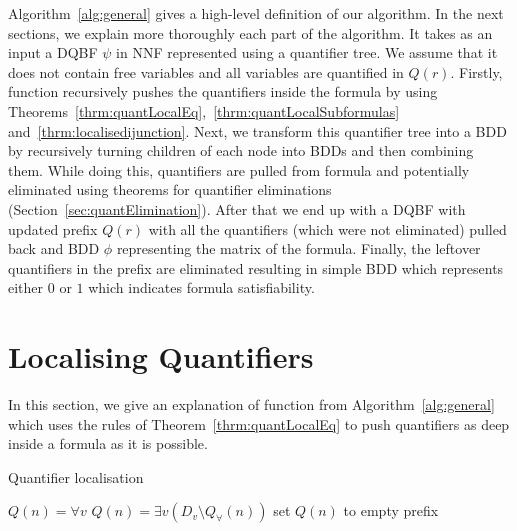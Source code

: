 \documentclass[
  digital, %
  color,
  twoside, %
  table,   %
  nolof,     %
  nolot,     %
]{fithesis3}
\theoremstyle{definition}
\theoremstyle{remark}
\newcommand{\qtlabel}[1]{l({#1})}
\newcommand{\prefix}[1]{Q({#1})}
\newcommand{\eprefix}[1]{Q_{\exists}(#1)}
\newcommand{\uprefix}[1]{Q_{\forall}(#1)}
\newcommand{\children}[1]{children({#1})}
\begin{document}
Algorithm~\ref{alg:general} gives a high-level definition of our algorithm. In the next sections, we explain more thoroughly each part of the algorithm. It takes as an input a DQBF $\psi$ in NNF represented using a quantifier tree. We assume that it does not contain free variables and all variables are quantified in $\prefix{r}$. Firstly, function  recursively pushes the quantifiers inside the formula by using Theorems~\ref{thrm:quantLocalEq},~\ref{thrm:quantLocalSubformulas} and~\ref{thrm:localisedijunction}. Next, we transform this quantifier tree into a BDD by recursively turning children of each node into BDDs and then combining them. While doing this, quantifiers are pulled from formula and potentially eliminated using theorems for quantifier eliminations (Section~\ref{sec:quantElimination}). After that we end up with a DQBF with updated prefix $\prefix{r}$ with all the quantifiers (which were not eliminated) pulled back and BDD $\phi$ representing the matrix of the formula. Finally, the leftover quantifiers in the prefix are eliminated resulting in simple BDD which represents either $0$ or $1$ which indicates formula satisfiability.

\section{Localising Quantifiers}
\label{sec:alglocalise}
In this section, we give an explanation of function  from Algorithm~\ref{alg:general} which uses the rules of Theorem~\ref{thrm:quantLocalEq} to push quantifiers as deep inside a formula as it is possible.

\begin{algorithm}
  \caption{Quantifier localisation}
  \label{alg:localise}
  \begin{algorithmic}[1]
      \If{$\qtlabel{n} = {\land}$}
        \State {}\label{localise:calland}
      \ElsIf{$\qtlabel{n} = {\lor}$}
        \State {}\label{localise:callor}
      \ElsIf{$\qtlabel{n} = v$ or $\qtlabel{n} = \neg v$}
        \If{$v \in \uprefix{n}$}
          \State $\prefix{n} = \forall v$
        \ElsIf{$v \in \eprefix{n}$}
          \State $\prefix{n} = \exists v(D_v \setminus \uprefix{n})$
        \Else
          \State set $\prefix{n}$ to empty prefix
        \EndIf
      \EndIf
      \ForAll{$n' \in \children{n}$}
        \State {}\label{localise:callchildren}
      \EndFor
    \EndFunction
  \end{algorithmic}
\end{algorithm}
\end{document}
